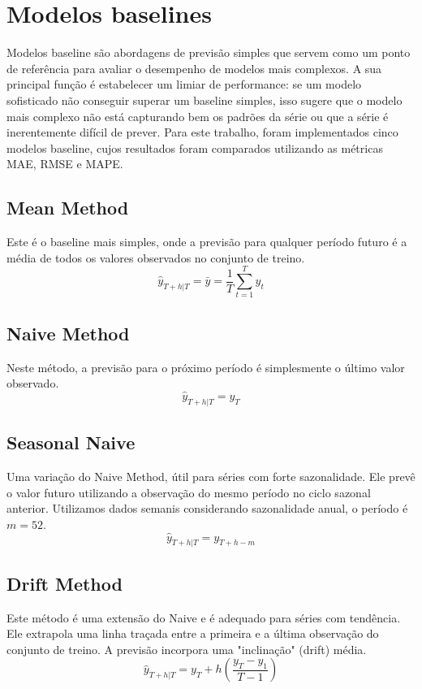 \documentclass{article}
\begin{document}
\section*{Modelos baselines}

Modelos baseline são abordagens de previsão simples que servem como um ponto de referência para avaliar o desempenho de modelos mais complexos. A sua principal função é estabelecer um limiar de performance: se um modelo sofisticado não conseguir superar um baseline simples, isso sugere que o modelo mais complexo não está capturando bem os padrões da série ou que a série é inerentemente difícil de prever. Para este trabalho, foram implementados cinco modelos baseline, cujos resultados foram comparados utilizando as métricas MAE, RMSE e MAPE.

\subsection*{Mean Method}
Este é o baseline mais simples, onde a previsão para qualquer período futuro é a média de todos os valores observados no conjunto de treino.
$$ \hat{y}_{T+h|T} = \bar{y} = \frac{1}{T}\sum_{t=1}^{T}y_t $$

\subsection*{Naive Method}
Neste método, a previsão para o próximo período é simplesmente o último valor observado.
$$ \hat{y}_{T+h|T} = y_T $$

\subsection*{Seasonal Naive}
Uma variação do Naive Method, útil para séries com forte sazonalidade. Ele prevê o valor futuro utilizando a observação do mesmo período no ciclo sazonal anterior. Utilizamos dados semanis considerando sazonalidade anual, o período é $m=52$.
$$ \hat{y}_{T+h|T} = y_{T+h-m} $$

\subsection*{Drift Method}
Este método é uma extensão do Naive e é adequado para séries com tendência. Ele extrapola uma linha traçada entre a primeira e a última observação do conjunto de treino. A previsão incorpora uma "inclinação" (drift) média.
$$ \hat{y}_{T+h|T} = y_T + h \left( \frac{y_T - y_1}{T-1} \right) $$
\end{document}
